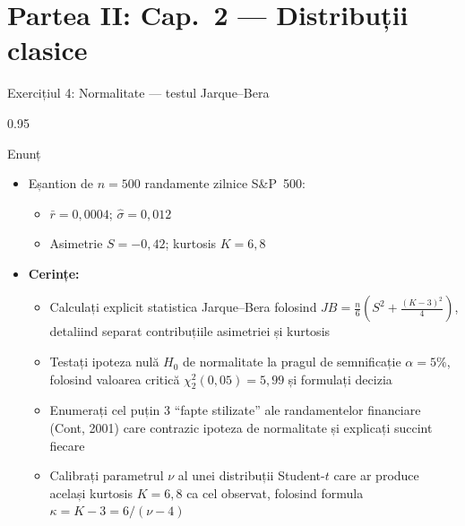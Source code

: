 \documentclass[9pt, aspectratio=169, t]{beamer}
\begin{document}
\section{Partea II: Cap.~2 --- Distribuții clasice}

\begin{frame}[shrink=25]{Exercițiul 4: Normalitate --- testul Jarque--Bera}
\begin{cminipage}{0.95\textwidth}
\begin{block}{Enunț}
\begin{itemize}\setlength{\itemsep}{0pt}
    \item Eșantion de $n = 500$ randamente zilnice S\&P~500:
    \begin{itemize}\setlength{\itemsep}{0pt}
        \item $\bar{r} = 0{,}0004$; $\hat\sigma = 0{,}012$
        \item Asimetrie $S = -0{,}42$; kurtosis $K = 6{,}8$
    \end{itemize}
    \item \textbf{Cerințe:}
    \begin{itemize}\setlength{\itemsep}{0pt}
        \item Calculați explicit statistica Jarque--Bera folosind $JB = \frac{n}{6}\left(S^2 + \frac{(K-3)^2}{4}\right)$, detaliind separat contribuțiile asimetriei și kurtosis
        \item Testați ipoteza nulă $H_0$ de normalitate la pragul de semnificație $\alpha = 5\%$, folosind valoarea critică $\chi^2_2(0{,}05) = 5{,}99$ și formulați decizia
        \item Enumerați cel puțin 3 ``fapte stilizate'' ale randamentelor financiare (Cont, 2001) care contrazic ipoteza de normalitate și explicați succint fiecare
        \item Calibrați parametrul $\nu$ al unei distribuții Student-$t$ care ar produce același kurtosis $K = 6{,}8$ ca cel observat, folosind formula $\kappa = K - 3 = 6/(\nu - 4)$
    \end{itemize}
\end{itemize}
\end{block}
\end{cminipage}
\end{frame}
\end{document}
